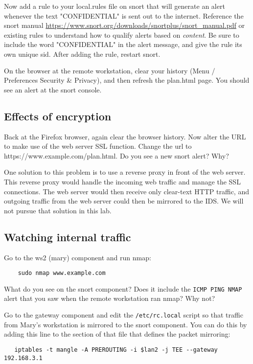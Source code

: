 Now add a rule to your local.rules file on snort that will generate an alert 
whenever the text "CONFIDENTIAL" is sent out to the internet.  Reference 
the snort manual \url{https://www.snort.org/downloads/snortplus/snort_manual.pdf}
or existing rules to understand how to qualify alerts based on \textit{content}.  Be sure to include the
word "CONFIDENTIAL" in the alert message, and give the
rule its own unique sid.  After adding the rule, restart snort.

On the browser at the remote workstation, clear your history (Menu / Preferences 
Security \& Privacy), and then refresh the plan.html page.  You should see an alert at
the snort console.

\subsection{Effects of encryption}
Back at the Firefox browser, again clear the browser history. Now alter the URL to make
use of the web server SSL function.  Change the url to https://www.example.com/plan.html.
Do you see a new snort alert?  Why?

One solution to this problem is to use a reverse proxy in front of the web server.  This
reverse proxy would handle the incoming web traffic and manage the SSL connections.
The web server would then receive only clear-text HTTP traffic, and outgoing traffic from the web server
could then be mirrored to the IDS.  We will not pursue that solution in this lab.

\subsection{Watching internal traffic}
Go to the ws2 (mary) component and run nmap:
\begin{verbatim}
    sudo nmap www.example.com
\end{verbatim}
What do you see on the snort component?  Does it include the {\tt ICMP PING NMAP}
alert that you saw when the remote workstation ran nmap?  Why not?

Go to the gateway component and edit the {\tt /etc/rc.local} script so that traffic
from Mary's workstation is mirrored to the snort component.  You can do this by adding
this line to the section of that file that defines the packet mirroring:
\begin{verbatim}
   iptables -t mangle -A PREROUTING -i $lan2 -j TEE --gateway 192.168.3.1
\end{verbatim}

